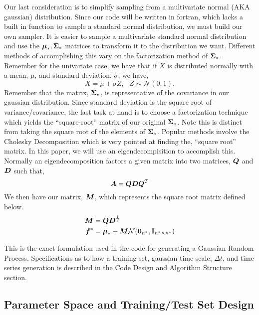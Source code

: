 \documentclass{article}
\begin{document}
Our last consideration is to simplify sampling from a multivariate normal (AKA gaussian) distribution. Since our code will be written in fortran, which lacks a built in function to sample a standard normal distribution, we must build our own sampler. It is easier to sample a multivariate standard normal distribution and use the $\boldsymbol{\mu}_*, \boldsymbol{\Sigma}_*$ matrices to transform it to the distribution we want. Different methods of accomplishing this vary on the factorization method of $\boldsymbol{\Sigma}_*$. Remember for the univariate case, we have that if $X$ is distributed normally with a mean, $\mu$, and standard deviation, $\sigma$, we have, 
\[X = \mu + \sigma Z, \text{  } Z \sim \mathcal{N}(0, 1).\]
Remember that the matrix, $\boldsymbol{\Sigma}_*$, is representative of the covariance in our gaussian distribution. Since standard deviation is the square root of variance/covariance, the last task at hand is to choose a factorization technique which yields the ``square-root'' matrix of our original $\boldsymbol{\Sigma}_*$. Note this is distinct from taking the square root of the elements of $\boldsymbol{\Sigma}_*$. Popular methods involve the Cholesky Decomposition which is very pointed at finding the, ``square root''  matrix. In this paper, we will use an eigendecompisition to accomplish this. Normally an eigendecomposition factors a given matrix into two matrices, $\boldsymbol{Q}$ and $\boldsymbol{D}$ such that, 
\[ 
    \boldsymbol{A} = \boldsymbol{Q}\boldsymbol{D}\boldsymbol{Q}^T
\]
We then have our matrix, $\boldsymbol{M}$, which represents the square root matrix defined below. 
\begin{align*}
    \boldsymbol{M} &= \boldsymbol{Q}\boldsymbol{D}^{\frac{1}{2}} \\
    \boldsymbol{f}^* &= \boldsymbol{\mu}_* + \boldsymbol{M}\mathcal{N}(\boldsymbol{0}_{n^*}, \boldsymbol{\mathrm{I}}_{n^* \times n^*})
\end{align*}

This is the exact formulation used in the code for generating a Gaussian Random Process. Specifications as to how a training set, gaussian time scale, $\Delta t$, and time series generation is described in the Code Design and Algorithm Structure section. 

\subsection{Parameter Space and Training/Test Set Design}
\end{document}
